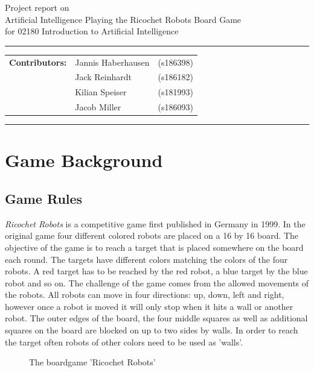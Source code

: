 \documentclass[a4paper,10pt]{article}
\begin{document}
\begin{center}
Project report on\\
\vspace{0.5cm}
{{\Large \sc Artificial Intelligence Playing the Ricochet Robots Board Game}}\\
\vspace{0.5cm} for 02180 Introduction to Artificial Intelligence
\end{center}
\rule{\textwidth}{0.5pt}
\begin{description}
\item\begin{tabular}{rll}
    \textbf{Contributors:}& Jannis Haberhausen &(s186398)\\ & Jack Reinhardt &(s186182)\\ & Kilian Speiser &(s181993)\\ & Jacob Miller &(s186093) \\
\end{tabular}
\end{description}
\rule{\textwidth}{1pt}

\tableofcontents
\thispagestyle{empty}
\newpage
\section{Game Background}
\subsection{Game Rules}
\textit{Ricochet Robots} is a competitive game first published in Germany in 1999. In the original game four different colored robots are placed on a 16 by 16 board. The objective of the game is to reach a target that is placed somewhere on the board each round. The targets have different colors matching the colors of the four robots. A red target has to be reached by the red robot, a blue target by the blue robot and so on. The challenge of the game comes from the allowed movements of the robots. All robots can move in four directions: up, down, left and right, however once a robot is moved it will only stop when it hits a wall or another robot. The outer edges of the board, the four middle squares as well as additional squares on the board are blocked on up to two sides by walls. In order to reach the target often robots of other colors need to be used as 'walls'.
\begin{figure}[!htb]
\caption{The boardgame 'Ricochet Robots'}
\label{fig:originalgame}
\end{figure}
\end{document}
